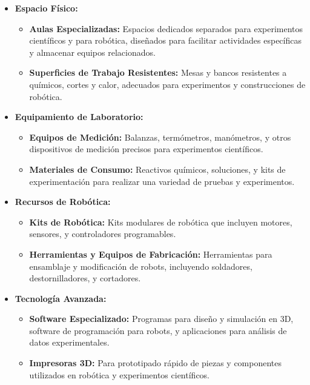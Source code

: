 \begin{itemize}
    \item \textbf{Espacio Físico:}
            \begin{itemize}
                \item \textbf{Aulas Especializadas:} Espacios dedicados separados para experimentos científicos y para robótica, diseñados para facilitar actividades específicas y almacenar equipos relacionados.
                \item \textbf{Superficies de Trabajo Resistentes:} Mesas y bancos resistentes a químicos, cortes y calor, adecuados para experimentos y construcciones de robótica.
            \end{itemize}
    \item \textbf{Equipamiento de Laboratorio:}
            \begin{itemize}
                \item \textbf{Equipos de Medición:} Balanzas, termómetros, manómetros, y otros dispositivos de medición precisos para experimentos científicos.
                \item \textbf{Materiales de Consumo:} Reactivos químicos, soluciones, y kits de experimentación para realizar una variedad de pruebas y experimentos.
            \end{itemize}
    \item \textbf{Recursos de Robótica:}
            \begin{itemize}
                \item \textbf{Kits de Robótica:} Kits modulares de robótica que incluyen motores, sensores, y controladores programables.
                \item \textbf{Herramientas y Equipos de Fabricación:} Herramientas para ensamblaje y modificación de robots, incluyendo soldadores, destornilladores, y cortadores.
            \end{itemize}
    \item \textbf{Tecnología Avanzada:}
            \begin{itemize}
                \item \textbf{Software Especializado:} Programas para diseño y simulación en 3D, software de programación para robots, y aplicaciones para análisis de datos experimentales.
                \item \textbf{Impresoras 3D:} Para prototipado rápido de piezas y componentes utilizados en robótica y experimentos científicos.
            \end{itemize}

\end{itemize}
